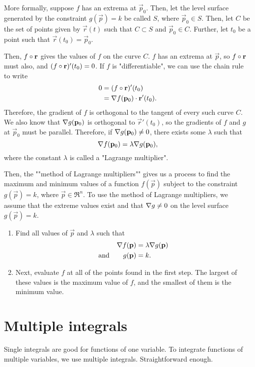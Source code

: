 \documentclass[knowledge]{mathnotes}
\begin{document}
More formally, suppose $f$ has an extrema at $\vec p_0$. Then, let the level
surface generated by the constraint $g(\vec p) = k$ be called $S$, where
$\vec p_0 \in S$. Then, let $C$ be the set of points given by $\vec r(t)$ such
that $C \subset S$ and $\vec p_0 \in C$. Further, let $t_0$ be a point such
that $\vec r(t_0) = \vec p_0$.

Then, $f \circ \mathbf{r}$ gives the values of $f$ on the curve $C$. $f$ has an
extrema at $\vec p$, so $f \circ \mathbf{r}$ must also, and $(f \circ \mathbf{r})'(t_0) = 0$. If $f$ is "differentiable", we can use the chain rule to
write
\begin{alignat*}{1}
  0 &= (f \circ \mathbf{r})'(t_0) \\
  &= \nabla f(\mathbf{p}_0) \cdot \mathbf{r}'(t_0).
\end{alignat*}
Therefore, the gradient of $f$ is orthogonal to the tangent of every such
curve $C$. We also know that $\nabla g(\mathbf{p}_0)$ is orthogonal to $\vec
r'(t_0)$, so the gradients of $f$ and $g$ at $\vec p_0$ must be parallel.
Therefore, if $\nabla g(\mathbf{p}_0) \ne 0$, there exists some $\lambda$ such
that
\begin{equation}
  \nabla f(\mathbf{p}_0) = \lambda \nabla g(\mathbf{p}_0),
\end{equation}
where the constant $\lambda$ is called a "Lagrange multiplier".

Then, the ""method of Lagrange multipliers"" gives us a process to
find the maximum and minimum values of a function $f(\vec p)$ subject to the
constraint  $g(\vec p) = k$, where $\vec p \in \Re^n$. To use the method of
Lagrange multipliers, we assume that the extreme values exist and that
$\nabla g \ne 0$ on the level surface $g(\vec p) = k$.
\begin{enumerate}
  \item Find all values of $\vec p$ and $\lambda$ such that
  \begin{alignat*}{1}
    \nabla f(\mathbf{p}) &=  \lambda \nabla g(\mathbf{p}) \\
  \text{and}\qquad g(\mathbf{p}) &= k. \\
  \end{alignat*}

  \item Next, evaluate $f$ at all of the points found in the first step. The
  largest of these values is the maximum value of $f$, and the smallest of
  them is the minimum value.
\end{enumerate}

\chapter{Multiple integrals}
Single integrals are good for functions of one variable. To integrate
functions of multiple variables, we use multiple integrals. Straightforward
enough.
\end{document}
